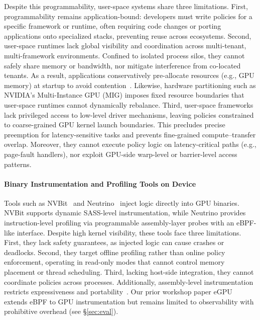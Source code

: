 Despite this programmability, user-space systems share three limitations. 
First, programmability remains application-bound: developers must write policies for a specific framework or runtime, often requiring code changes or porting applications onto specialized stacks, preventing reuse across ecosystems.
Second, user-space runtimes lack global visibility and coordination across multi-tenant, multi-framework environments. Confined to isolated process silos, they cannot safely share memory or bandwidth, nor mitigate interference from co-located tenants. As a result, applications conservatively pre-allocate resources (e.g., GPU memory) at startup to avoid contention~\cite{xiao2018gandiva,yu2020fine}. Likewise, hardware partitioning such as NVIDIA's Multi-Instance GPU (MIG) imposes fixed resource boundaries that user-space runtimes cannot dynamically rebalance.
Third, user-space frameworks lack privileged access to low-level driver mechanisms, leaving policies constrained to coarse-grained GPU kernel launch boundaries. This precludes precise preemption for latency-sensitive tasks and prevents fine-grained compute–transfer overlap. Moreover, they cannot execute policy logic on latency-critical paths (e.g., page-fault handlers), nor exploit GPU-side warp-level or barrier-level access patterns.

\paragraph{Binary Instrumentation and Profiling Tools on Device}
\label{sec:background}
Tools such as NVBit~\cite{villa2019nvbit} and Neutrino~\cite{neutrino} inject logic directly into GPU binaries. NVBit supports dynamic SASS-level instrumentation, while Neutrino provides instruction-level profiling via programmable assembly-layer probes with an eBPF-like interface. Despite high kernel visibility, these tools face three limitations. First, they lack safety guarantees, as injected logic can cause crashes or deadlocks. Second, they target offline profiling rather than online policy enforcement, operating in read-only modes that cannot control memory placement or thread scheduling. Third, lacking host-side integration, they cannot coordinate policies across processes. Additionally, assembly-level instrumentation restricts expressiveness and portability~\cite{neutrino}. Our prior workshop paper eGPU~\cite{egpu} extends eBPF to GPU instrumentation but remains limited to observability with prohibitive overhead (see \S\ref{sec:eval}).

